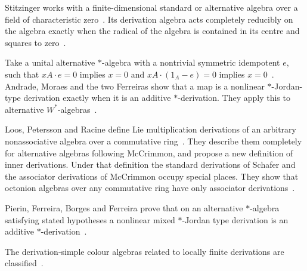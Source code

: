 Stitzinger works with a finite-dimensional standard or alternative algebra
over a field of characteristic zero~\cite{WlStandardAndAlternativeAlgebras1974}. Its derivation algebra acts
completely reducibly on the algebra exactly when the radical of the algebra is
contained in its centre and squares to
zero~\cite{WlStandardAndAlternativeAlgebras1974}.

Take a unital alternative $*$-algebra with a nontrivial symmetric
idempotent $e$, such that $xA\cdot e=0$ implies $x=0$ and $xA\cdot(1_A-e)=0$
implies $x=0$~\cite{WlNonlinearStarJordanTypeDerivat2022}. Andrade, Moraes and the two Ferreiras show that a map is a
nonlinear $*$-Jordan-type derivation exactly when it is an additive
$*$-derivation. They apply this to alternative %
$W^*$-algebras~\cite{WlNonlinearStarJordanTypeDerivat2022}.

Loos, Petersson and Racine define Lie multiplication derivations of an
arbitrary nonassociative algebra over a commutative ring~\cite{WlInnerDerivationsOfAlternativeA2008}. They describe them
completely for alternative algebras following McCrimmon, and propose a new
definition of inner derivations. Under that definition the standard derivations
of Schafer and
the associator derivations of McCrimmon occupy special places. They show that %
octonion algebras over any commutative ring have only associator
derivations~\cite{WlInnerDerivationsOfAlternativeA2008}.

Pierin, Ferreira, Borges and Ferreira prove that on an alternative $*$-algebra
satisfying stated hypotheses a nonlinear mixed $*$-Jordan type derivation is
an additive $*$-derivation~\cite{WlAboutTheAdditivityOfANonlinear2020}.

The derivation-simple colour algebras related to locally finite derivations
are classified~\cite{WlClassificationOfDerivationSimp2020}.
